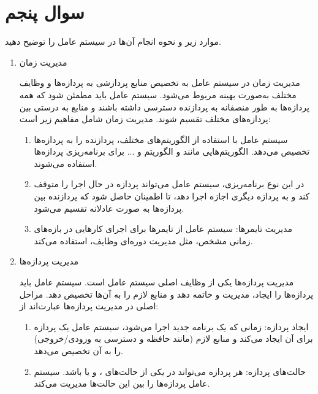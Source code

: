 \section{سوال پنجم}


موارد زیر و نحوه انجام آن‌ها در سیستم عامل را توضیح دهید.
\begin{enumerate}
	\item 
	مدیریت زمان
	\begin{qsolve}
		مدیریت زمان در سیستم عامل به تخصیص منابع پردازشی به پردازه‌ها و وظایف مختلف به‌صورت بهینه مربوط می‌شود. سیستم عامل باید مطمئن شود که همه پردازه‌ها به طور منصفانه به پردازنده دسترسی داشته باشند و منابع به درستی بین پردازه‌های مختلف تقسیم شوند. مدیریت زمان شامل مفاهیم زیر است:
		
		\begin{enumerate}
			\item 
			سیستم عامل با استفاده از الگوریتم‌های مختلف، پردازنده را به پردازه‌ها تخصیص می‌دهد. الگوریتم‌هایی مانند  و الگوریتم  و ... برای برنامه‌ریزی پردازه‌ها استفاده می‌شوند.
			
			\item 
			در این نوع برنامه‌ریزی، سیستم عامل می‌تواند پردازه در حال اجرا را متوقف کند و به پردازه دیگری اجازه اجرا دهد، تا اطمینان حاصل شود که پردازنده بین پردازه‌ها به صورت عادلانه تقسیم می‌شود.
			
			\item 
			مدیریت تایمرها: سیستم عامل از تایمرها برای اجرای کارهایی در بازه‌های زمانی مشخص، مثل مدیریت دوره‌ای وظایف، استفاده می‌کند.
		\end{enumerate}
	\end{qsolve}
	
	
	\item 
	مدیریت پردازه‌ها
	\begin{qsolve}
		مدیریت پردازه‌ها یکی از وظایف اصلی سیستم عامل است. سیستم عامل باید پردازه‌ها را ایجاد، مدیریت و خاتمه دهد و منابع لازم را به آن‌ها تخصیص دهد. مراحل اصلی در مدیریت پردازه‌ها عبارت‌اند از:
		\begin{enumerate}
			\item 
			ایجاد پردازه: زمانی که یک برنامه جدید اجرا می‌شود، سیستم عامل یک پردازه برای آن ایجاد می‌کند و منابع لازم (مانند حافظه و دسترسی به ورودی/خروجی) را به آن تخصیص می‌دهد.
			
			\item 
			حالت‌های پردازه: هر پردازه می‌تواند در یکی از حالت‌های  ،  و یا  باشد. سیستم عامل پردازه‌ها را بین این حالت‌ها مدیریت می‌کند.
			

\end{enumerate}
\end{qsolve}
\end{enumerate}
